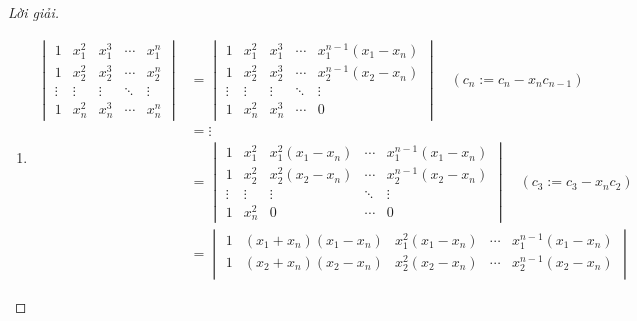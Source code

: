 \documentclass[class=nhvh-linear-algebra,crop=false]{standalone}
\begin{document}
\begin{proof}[Lời giải]
	\begin{enumerate}[label = (\alph*)]
		\item
		      \begin{align*}
			      \begin{vmatrix}
				      1      & x_{1}^{2} & x_{1}^{3} & \cdots & x_{1}^{n} \\
				      1      & x_{2}^{2} & x_{2}^{3} & \cdots & x_{2}^{n} \\
				      \vdots & \vdots    & \vdots    & \ddots & \vdots    \\
				      1      & x_{n}^{2} & x_{n}^{3} & \cdots & x_{n}^{n}
			      \end{vmatrix}
			       & =
			      \begin{vmatrix}
				      1      & x_{1}^{2} & x_{1}^{3} & \cdots & x_{1}^{n-1}(x_{1} - x_{n}) \\
				      1      & x_{2}^{2} & x_{2}^{3} & \cdots & x_{2}^{n-1}(x_{2} - x_{n}) \\
				      \vdots & \vdots    & \vdots    & \ddots & \vdots                     \\
				      1      & x_{n}^{2} & x_{n}^{3} & \cdots & 0
			      \end{vmatrix}\quad(c_{n}:= c_{n} - x_{n}c_{n-1})                                     \\
			       & = \vdots                                                                                              \\
			       & =
			      \begin{vmatrix}
				      1      & x_{1}^{2} & x_{1}^{2}(x_{1} - x_{n}) & \cdots & x_{1}^{n-1}(x_{1} - x_{n}) \\
				      1      & x_{2}^{2} & x_{2}^{2}(x_{2} - x_{n}) & \cdots & x_{2}^{n-1}(x_{2} - x_{n}) \\
				      \vdots & \vdots    & \vdots                   & \ddots & \vdots                     \\
				      1      & x_{n}^{2} & 0                        & \cdots & 0
			      \end{vmatrix}\quad(c_{3}:=c_{3} - x_{n}c_{2})                      \\
			       & =
			      \begin{vmatrix}
				      1      & (x_{1} + x_{n})(x_{1} - x_{n}) & x_{1}^{2}(x_{1} - x_{n}) & \cdots & x_{1}^{n-1}(x_{1} - x_{n}) \\
				      1      & (x_{2} + x_{n})(x_{2} - x_{n}) & x_{2}^{2}(x_{2} - x_{n}) & \cdots & x_{2}^{n-1}(x_{2} - x_{n}) \\

\end{vmatrix}
\end{align*}
\end{enumerate}
\end{proof}
\end{document}
